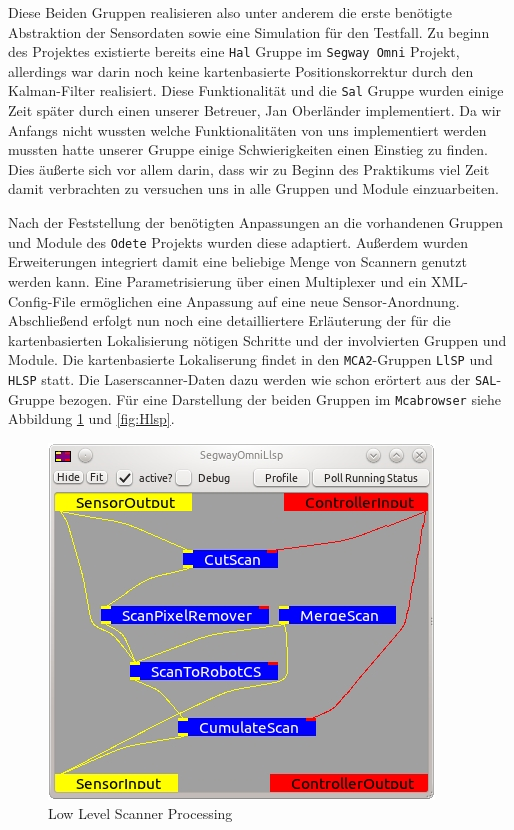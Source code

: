Diese Beiden Gruppen realisieren also unter anderem die erste benötigte
 Abstraktion der Sensordaten sowie eine Simulation für den Testfall. Zu beginn
 des Projektes existierte bereits eine \lstinline{Hal} Gruppe im \lstinline{Segway Omni} Projekt,
 allerdings war darin noch keine kartenbasierte
 Positionskorrektur durch den Kalman-Filter realisiert. Diese Funktionalität und die \lstinline{Sal} Gruppe wurden
 einige Zeit später durch einen unserer Betreuer, Jan Oberländer implementiert. Da wir Anfangs nicht wussten
 welche Funktionalitäten von uns implementiert werden mussten hatte unserer Gruppe einige Schwierigkeiten
 einen Einstieg zu finden. Dies äußerte sich vor allem darin, dass wir zu Beginn des Praktikums viel Zeit damit
 verbrachten zu versuchen uns in alle Gruppen und Module einzuarbeiten.

Nach der Feststellung der benötigten Anpassungen an die vorhandenen Gruppen und Module des \lstinline{Odete} Projekts wurden
 diese adaptiert. Außerdem wurden Erweiterungen integriert damit eine beliebige Menge von Scannern genutzt werden kann.
 Eine Parametrisierung über einen Multiplexer und ein XML-Config-File
 ermöglichen eine Anpassung auf eine neue Sensor-Anordnung. Abschließend erfolgt
 nun noch eine detailliertere Erläuterung der für die kartenbasierten
 Lokalisierung nötigen Schritte und der involvierten Gruppen und Module. Die kartenbasierte Lokaliserung
 findet in den \lstinline{MCA2}-Gruppen \lstinline{LlSP} und \lstinline{HLSP}
 statt. Die Laserscanner-Daten dazu werden wie schon erörtert aus der
 \lstinline{SAL}-Gruppe bezogen.
 Für eine Darstellung der beiden Gruppen im \lstinline{Mcabrowser} siehe
 Abbildung \ref{fig:Llsp} und \ref{fig:Hlsp}.
 
\begin{figure}[h]
\center
\includegraphics[scale=0.7]{graphics/Llsp.jpg}
\caption{\label{fig:Llsp} Low Level Scanner Processing}
\end{figure}

